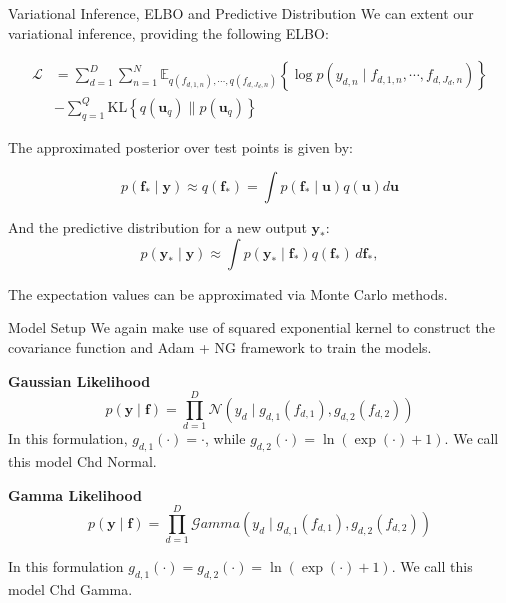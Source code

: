 \begin{frame}{Variational Inference, ELBO and Predictive Distribution}
	We can extent our variational inference, providing the following ELBO:
	
\begin{equation*}
	\begin{split}
	\mathcal{L} &= \sum_{d=1}^D \sum_{n=1}^{N} \mathbb{E}_{q(f_{d,1,n}), \cdots, q(f_{d,J_d,n})} 
	\left\{ \log p\left( y_{d,n} \mid f_{d,1,n}, \cdots, f_{d,J_d,n} \right) \right\} \\
	&- \sum_{q=1}^Q \text{KL}\left\{ q(\mathbf{u}_q) \parallel p(\mathbf{u}_q) \right\}
	\end{split}
\end{equation*}

The approximated posterior over test points is given by:

\begin{equation*}
	p(\mathbf{f}_* \mid \mathbf{y}) \approx q(\mathbf{f}_*) = \int p(\mathbf{f}_* \mid \mathbf{u}) q(\mathbf{u}) d\mathbf{u}
\end{equation*}

And the predictive distribution for a new output $\mathbf{y}_*$:
\begin{equation*}
	p(\mathbf{y}_* \mid \mathbf{y}) \approx \int p(\mathbf{y}_* \mid \mathbf{f}_*) q(\mathbf{f}_*) \, d\mathbf{f}_*,
\end{equation*}

The expectation values can be approximated via Monte Carlo methods.
	
\end{frame}

\begin{frame}{Model Setup}
	We again make use of squared exponential kernel to construct the covariance function and Adam + NG framework to train the models.
		
	\begin{block}{\textbf{Gaussian Likelihood}}
		\begin{equation*}
			p(\mathbf{y} \mid \mathbf{f}) = \prod_{d=1}^{D} \mathcal{N}\left(y_{d}\mid g_{d,1}(f_{d,1}), g_{d,2}(f_{d,2}) \right)
		\end{equation*}
		In this formulation, \(g_{d,1}(\cdot) = \cdot\), while \(g_{d,2}(\cdot) = \ln(\exp(\cdot) + 1)\). We call this model Chd Normal.
	\end{block} 
	
	\begin{block}{\textbf{Gamma Likelihood}}
		\begin{equation*}
		p(\mathbf{y} \mid \mathbf{f}) = \prod_{d=1}^{D} \mathcal{G}amma\left( y_{d} \mid g_{d,1}(f_{d,1}), g_{d,2}(f_{d,2}) \right)
		\end{equation*}
		
		In this formulation \(g_{d,1}(\cdot) = g_{d,2}(\cdot) = \ln(\exp(\cdot) + 1)\). We call this model Chd Gamma.
	\end{block}
		
\end{frame}

